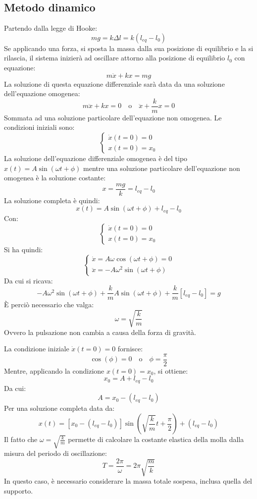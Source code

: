 \documentclass[a4paper,12pt]{article}
\begin{document}
\subsection{Metodo dinamico}
Partendo dalla legge di Hooke:
$$
mg = k \Delta l = k(l_{eq} - l_0)
$$
Se applicando una forza, si sposta la massa dalla sua posizione di equilibrio e la si rilascia,
il sistema inizierà ad oscillare attorno alla posizione di equilibrio $l_{0}$ con equazione:
$$
m\ddot{x} + kx = mg
$$
La soluzione di questa equazione differenziale sarà data da una soluzione dell'equazione
omogenea:
$$
m\ddot{x} + kx = 0 \quad \text{o} \quad \ddot{x} + \frac{k}{m}x = 0
$$
Sommata ad una soluzione particolare dell'equazione non omogenea.
Le condizioni iniziali sono:
$$
\begin{cases}
    \dot{x}(t=0)=0 \\
    x(t=0)=x_0
\end{cases}
$$
La soluzione dell'equazione differenziale omogenea è del tipo $x(t) = A \sin(\omega t+\phi)$
mentre una soluzione particolare dell'equazione non omogenea è la soluzione costante:
$$
x = \frac{mg}{k} = l_{eq} - l_0
$$
La soluzione completa è quindi:
$$
x(t) = A \sin(\omega t+\phi) + l_{eq} - l_0
$$
Con:
$$
\begin{cases}
    \dot{x}(t=0)=0 \\
    x(t=0)=x_0
\end{cases}
$$
Si ha quindi:
$$
\begin{cases}
    \dot{x} = A \omega \cos(\omega t + \phi) = 0 \\
    \ddot{x} = -A \omega^2 \sin(\omega t + \phi)
\end{cases}
$$
Da cui si ricava:
$$
-A \omega^2 \sin(\omega t + \phi) + \frac{k}{m} A \sin(\omega t + \phi) + \frac{k}{m}[l_{eq} - l_0] = g
$$
È perciò necessario che valga:
$$
\omega = \sqrt{\frac{k}{m}}
$$
Ovvero la pulsazione non cambia a causa della forza di gravità.

La condizione iniziale $\dot{x}(t=0)=0$ fornisce:
$$
\cos(\phi) = 0 \quad \text{o} \quad \phi = \frac{\pi}{2} 
$$
Mentre, applicando la condizione $x(t=0)=x_0$, si ottiene:
$$
x_0 = A + l_{eq} - l_0
$$
Da cui:
$$
A = x_0 - (l_{eq} - l_0)
$$
Per una soluzione completa data da:
$$
x(t) = [x_0 - (l_{eq} - l_0)]\sin(\sqrt{\frac{k}{m}}t+\frac{\pi}{2}) + (l_{eq} - l_0) 
$$
Il fatto che $\omega = \sqrt{\frac{k}{m}}$ permette di calcolare la costante elastica della molla dalla
misura del periodo di oscillazione:
$$
T = \frac{2\pi}{\omega} = 2\pi \sqrt{\frac{m}{k}}
$$
In questo caso, è necessario considerare la massa totale sospesa, inclusa quella del supporto.
\end{document}
